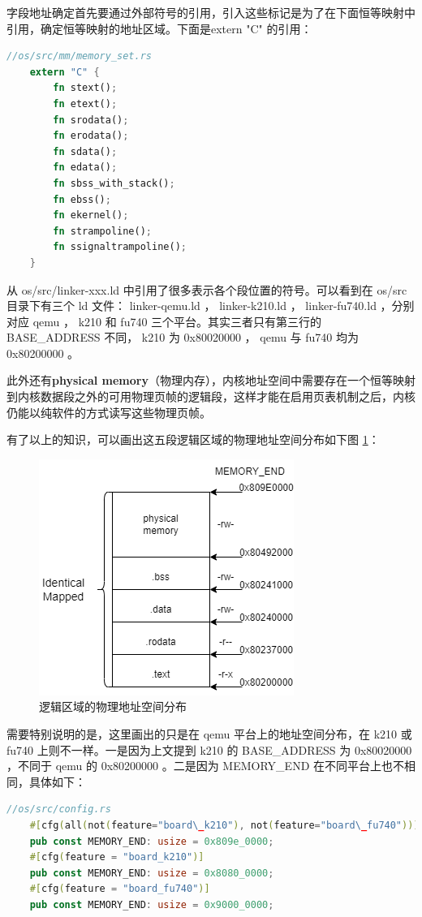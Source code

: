 字段地址确定首先要通过外部符号的引用，引入这些标记是为了在下面恒等映射中引用，确定恒等映射的地址区域。下面是extern "C" 的引用：
\begin{lstlisting}[language={Rust},caption={extern "C"}]
	//os/src/mm/memory_set.rs
	extern "C" {
		fn stext();
		fn etext();
		fn srodata();
		fn erodata();
		fn sdata();
		fn edata();
		fn sbss_with_stack();
		fn ebss();
		fn ekernel();
		fn strampoline();
		fn ssignaltrampoline();
	}
\end{lstlisting}
从 os/src/linker-xxx.ld 中引用了很多表示各个段位置的符号。可以看到在 os/src 目录下有三个 ld 文件： linker-qemu.ld ， linker-k210.ld ， linker-fu740.ld ，分别对应 qemu ， k210 和 fu740 三个平台。其实三者只有第三行的 BASE\_ADDRESS 不同， k210 为 0x80020000 ， qemu 与 fu740 均为 0x80200000 。

此外还有\textbf{physical memory}（物理内存），内核地址空间中需要存在一个恒等映射到内核数据段之外的可用物理页帧的逻辑段，这样才能在启用页表机制之后，内核仍能以纯软件的方式读写这些物理页帧。

有了以上的知识，可以画出这五段逻辑区域的物理地址空间分布如下图 \ref{逻辑区域的物理地址空间分布}：
\begin{figure}[htb]
	\centering
	\includegraphics[width=0.5\linewidth]{figures/04-02-逻辑区域的物理地址空间.png}
	\caption{
		逻辑区域的物理地址空间分布
	}
	\label{逻辑区域的物理地址空间分布}
\end{figure}


需要特别说明的是，这里画出的只是在 qemu 平台上的地址空间分布，在 k210 或 fu740 上则不一样。一是因为上⽂提到 k210 的 BASE\_ADDRESS 为 0x80020000 ，不同于 qemu 的 0x80200000 。二是因为 MEMORY\_END 在不同平台上也不相同，具体如下：
\begin{lstlisting}[language={Rust},caption={config.rs}]
	//os/src/config.rs
	#[cfg(all(not(feature="board\_k210"), not(feature="board\_fu740")))]
	pub const MEMORY_END: usize = 0x809e_0000;
	#[cfg(feature = "board_k210")]
	pub const MEMORY_END: usize = 0x8080_0000;
	#[cfg(feature = "board_fu740")]
	pub const MEMORY_END: usize = 0x9000_0000;
\end{lstlisting}

